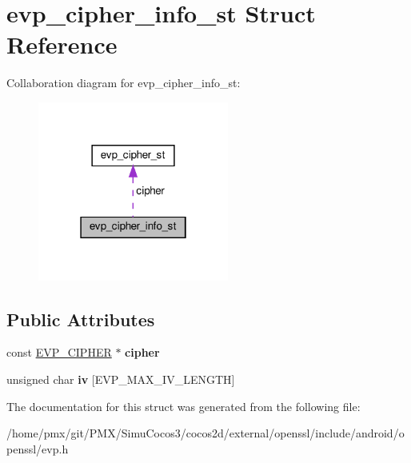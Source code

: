 \hypertarget{structevp__cipher__info__st}{}\section{evp\+\_\+cipher\+\_\+info\+\_\+st Struct Reference}
\label{structevp__cipher__info__st}


Collaboration diagram for evp\+\_\+cipher\+\_\+info\+\_\+st\+:
\nopagebreak
\begin{figure}[H]
\begin{center}
\leavevmode
\includegraphics[width=178pt]{structevp__cipher__info__st__coll__graph}
\end{center}
\end{figure}
\subsection*{Public Attributes}
\begin{DoxyCompactItemize}
\item 
\mbox{\label{structevp__cipher__info__st_afc095106ae81894ca81b1eb65cc3921b}} 
const \hyperlink{structevp__cipher__st}{E\+V\+P\+\_\+\+C\+I\+P\+H\+ER} $\ast$ {\bfseries cipher}
\item 
\mbox{\label{structevp__cipher__info__st_a30cb6693b235e99d466df0daa2479d98}} 
unsigned char {\bfseries iv} \mbox{[}E\+V\+P\+\_\+\+M\+A\+X\+\_\+\+I\+V\+\_\+\+L\+E\+N\+G\+TH\mbox{]}
\end{DoxyCompactItemize}


The documentation for this struct was generated from the following file\+:\begin{DoxyCompactItemize}
\item 
/home/pmx/git/\+P\+M\+X/\+Simu\+Cocos3/cocos2d/external/openssl/include/android/openssl/evp.\+h\end{DoxyCompactItemize}
